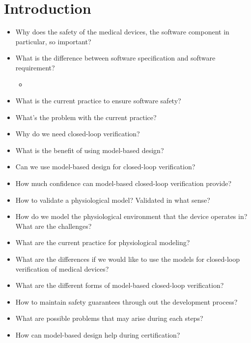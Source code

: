 \chapter{Introduction}
\begin{itemize}
  \item Why does the safety of the medical devices, the software component in particular, so important?
  \item What is the difference between software specification and software requirement?
	
	\begin{itemize}
		\item 
	\end{itemize}
	
  \item What is the current practice to ensure software safety? 
  
  \item What's the problem with the current practice?
  \item Why do we need closed-loop verification?
  
  \item What is the benefit of using model-based design?
  \item Can we use model-based design for closed-loop verification?
  \item How much confidence can model-based closed-loop verification provide?
  \item How to validate a physiological model? Validated in what sense?
  \item How do we model the physiological environment that the device operates in? What are the challenges?
  \item What are the current practice for physiological modeling?
  \item What are the differences if we would like to use the models for closed-loop verification of medical devices?
	\item What are the different forms of model-based closed-loop verification?

    \item How to maintain safety guarantees through out the development process?
    \item What are possible problems that may arise during each steps?
    \item How can model-based design help during certification?



\end{itemize}
